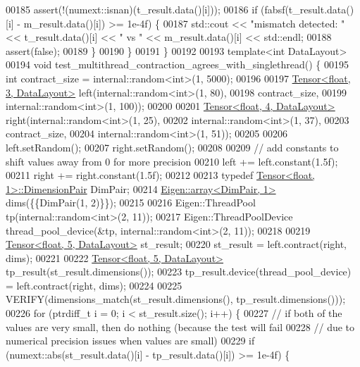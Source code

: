 \begin{DoxyCode}
00185     assert(!(numext::isnan)(t\_result.data()[i]));
00186     \textcolor{keywordflow}{if} (fabsf(t\_result.data()[i] - m\_result.data()[i]) >= 1e-4f) \{
00187       std::cout << \textcolor{stringliteral}{"mismatch detected: "} << t\_result.data()[i] << \textcolor{stringliteral}{" vs "} <<  m\_result.data()[i] << 
      std::endl;
00188       assert(\textcolor{keyword}{false});
00189     \}
00190   \}
00191 \}
00192 
00193 \textcolor{keyword}{template}<\textcolor{keywordtype}{int} DataLayout>
00194 \textcolor{keywordtype}{void} test\_multithread\_contraction\_agrees\_with\_singlethread() \{
00195   \textcolor{keywordtype}{int} contract\_size = internal::random<int>(1, 5000);
00196 
00197   \hyperlink{class_eigen_1_1_tensor}{Tensor<float, 3, DataLayout>} left(internal::random<int>(1, 80),
00198                                     contract\_size,
00199                                     internal::random<int>(1, 100));
00200 
00201   \hyperlink{class_eigen_1_1_tensor}{Tensor<float, 4, DataLayout>} right(internal::random<int>(1, 25),
00202                                      internal::random<int>(1, 37),
00203                                      contract\_size,
00204                                      internal::random<int>(1, 51));
00205 
00206   left.setRandom();
00207   right.setRandom();
00208 
00209   \textcolor{comment}{// add constants to shift values away from 0 for more precision}
00210   left += left.constant(1.5f);
00211   right += right.constant(1.5f);
00212 
00213   \textcolor{keyword}{typedef} \hyperlink{class_eigen_1_1_tensor}{Tensor<float, 1>::DimensionPair} DimPair;
00214   \hyperlink{class_eigen_1_1array}{Eigen::array<DimPair, 1>} dims(\{\{DimPair(1, 2)\}\});
00215 
00216   Eigen::ThreadPool tp(internal::random<int>(2, 11));
00217   Eigen::ThreadPoolDevice thread\_pool\_device(&tp, internal::random<int>(2, 11));
00218 
00219   \hyperlink{class_eigen_1_1_tensor}{Tensor<float, 5, DataLayout>} st\_result;
00220   st\_result = left.contract(right, dims);
00221 
00222   \hyperlink{class_eigen_1_1_tensor}{Tensor<float, 5, DataLayout>} tp\_result(st\_result.dimensions());
00223   tp\_result.device(thread\_pool\_device) = left.contract(right, dims);
00224 
00225   VERIFY(dimensions\_match(st\_result.dimensions(), tp\_result.dimensions()));
00226   \textcolor{keywordflow}{for} (ptrdiff\_t i = 0; i < st\_result.size(); i++) \{
00227     \textcolor{comment}{// if both of the values are very small, then do nothing (because the test will fail}
00228     \textcolor{comment}{// due to numerical precision issues when values are small)}
00229     \textcolor{keywordflow}{if} (numext::abs(st\_result.data()[i] - tp\_result.data()[i]) >= 1e-4f) \{

\end{DoxyCode}
